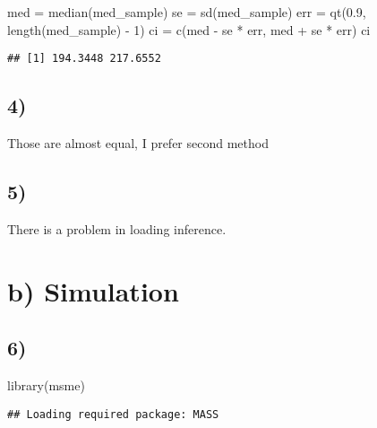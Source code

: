 \documentclass[
]{article}
\newenvironment{Shaded}{\begin{snugshade}}{\end{snugshade}}
\newcommand{\DecValTok}[1]{\textcolor[rgb]{0.00,0.00,0.81}{#1}}
\newcommand{\FloatTok}[1]{\textcolor[rgb]{0.00,0.00,0.81}{#1}}
\newcommand{\FunctionTok}[1]{\textcolor[rgb]{0.00,0.00,0.00}{#1}}
\newcommand{\NormalTok}[1]{#1}
\newcommand{\OtherTok}[1]{\textcolor[rgb]{0.56,0.35,0.01}{#1}}
\newcommand{\SpecialCharTok}[1]{\textcolor[rgb]{0.00,0.00,0.00}{#1}}
\begin{document}
\begin{Shaded}
\begin{Highlighting}[]
\NormalTok{med }\OtherTok{=} \FunctionTok{median}\NormalTok{(med\_sample)}
\NormalTok{se }\OtherTok{=} \FunctionTok{sd}\NormalTok{(med\_sample)}
\NormalTok{err }\OtherTok{=} \FunctionTok{qt}\NormalTok{(}\FloatTok{0.9}\NormalTok{, }\FunctionTok{length}\NormalTok{(med\_sample) }\SpecialCharTok{{-}} \DecValTok{1}\NormalTok{)}
\NormalTok{ci }\OtherTok{=} \FunctionTok{c}\NormalTok{(med }\SpecialCharTok{{-}}\NormalTok{ se }\SpecialCharTok{*}\NormalTok{ err, med }\SpecialCharTok{+}\NormalTok{ se }\SpecialCharTok{*}\NormalTok{ err)}
\NormalTok{ci}
\end{Highlighting}
\end{Shaded}

\begin{verbatim}
## [1] 194.3448 217.6552
\end{verbatim}

\hypertarget{section-3}{%
\subsection{4)}\label{section-3}}

Those are almost equal, I prefer second method

\hypertarget{section-4}{%
\subsection{5)}\label{section-4}}

There is a problem in loading inference.

\hypertarget{b-simulation}{%
\section{b) Simulation}\label{b-simulation}}

\hypertarget{section-5}{%
\subsection{6)}\label{section-5}}

\begin{Shaded}
\begin{Highlighting}[]
\FunctionTok{library}\NormalTok{(msme)}
\end{Highlighting}
\end{Shaded}

\begin{verbatim}
## Loading required package: MASS
\end{verbatim}
\end{document}
